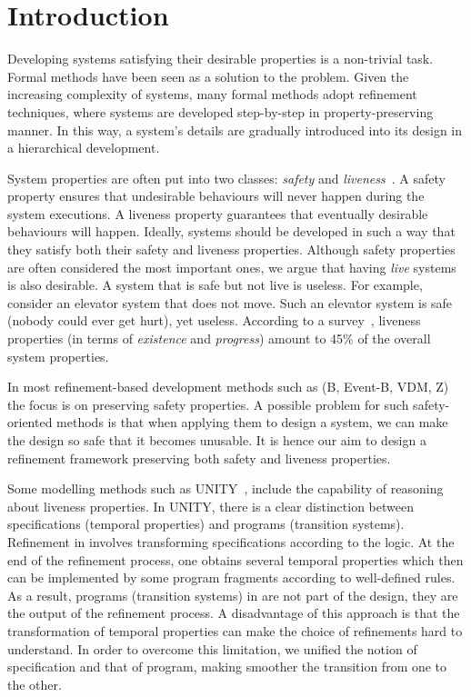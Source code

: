 \section{Introduction}
\label{sec:introduction}

Developing systems satisfying their desirable properties is a
non-trivial task.  Formal methods have been seen as a solution to the
problem.  Given the increasing complexity of systems, many
formal methods adopt refinement techniques, where systems are
developed step-by-step in property-preserving manner.  In this way,
a system's details are gradually introduced into its design in
a hierarchical development.

System properties are often put into two classes: \emph{safety}
and \emph{liveness}~\cite{DBLP:journals/tse/Lamport77}.  A safety
property ensures that undesirable behaviours will never happen
during the system executions.  A liveness property guarantees that
eventually desirable behaviours will happen.  Ideally, systems should
be developed in such a way that they satisfy both their safety and liveness
properties.  Although safety properties are often considered the most
important ones, we argue that having \emph{live} systems is also desirable.
A system that is safe but not live is useless.  For example, consider
an elevator system that does not move. Such an elevator system is safe
(nobody could ever get hurt), yet useless.  According to a
survey~\cite{DBLP:conf/icse/DwyerAC99}, liveness properties (in terms
of \emph{existence} and \emph{progress}) amount to 45\% of the overall
system properties.

In most refinement-based development methods such as (B, Event-B, VDM,
Z) the focus is on preserving safety properties.  A possible problem
for such safety-oriented methods is that when applying them to design a
system, we can make the design so safe that it becomes unusable.  It is
hence our aim to design a refinement framework preserving both safety
and liveness properties.

Some modelling methods such as UNITY~\cite{DBLP:books/daglib/0067338}, 
include the capability of reasoning about liveness properties.  In UNITY, there is a clear
distinction between specifications (temporal properties) and programs
(transition systems).  Refinement in \unity involves transforming
specifications according to the \unity logic.  At the end of the
refinement process, one obtains several temporal properties which then
can be implemented by some program fragments according to
well-defined rules.  As a result, programs (transition systems) in
\unity are not part of the design, they are the output of the
refinement process.  A disadvantage of this approach is that the
transformation of temporal properties can make the
choice of refinements hard to understand.  In order to overcome 
this limitation, we unified the notion of specification and that of
program, making smoother the transition from one to the other.

